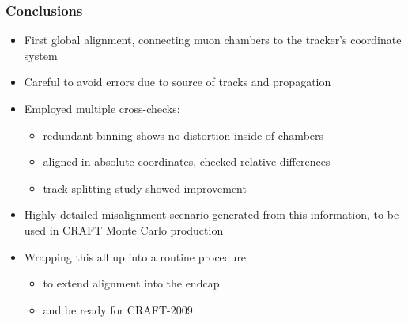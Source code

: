 \documentclass[compress]{beamer}
\begin{document}
\begin{frame}
\frametitle{Conclusions}

\begin{itemize}\setlength{\itemsep}{0.3 cm}
\item First global alignment, connecting muon chambers to the tracker's coordinate system
\item Careful to avoid errors due to source of tracks and propagation
\item Employed multiple cross-checks:
\begin{itemize}\setlength{\itemsep}{0.1 cm}
\item redundant binning shows no distortion inside of chambers
\item aligned in absolute coordinates, checked relative differences
\item track-splitting study showed improvement
\end{itemize}
\item Highly detailed misalignment scenario generated from this
  information, to be used in CRAFT Monte Carlo production
\item Wrapping this all up into a routine procedure
\begin{itemize}
\item to extend alignment into the endcap
\item and be ready for CRAFT-2009
\end{itemize}
\end{itemize}

\label{numpages}
\end{frame}












\end{document}
